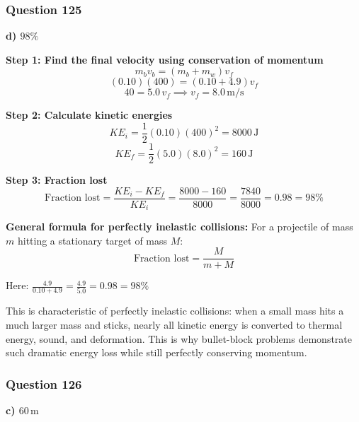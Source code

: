 \documentclass[12pt,letterpaper]{article}
\begin{document}
\subsubsection*{Question 125}

\begin{answerbox}
\textbf{d) $98\%$}
\end{answerbox}

\begin{explanationbox}
\textbf{Step 1: Find the final velocity using conservation of momentum}
\[
m_b v_b = (m_b + m_w)v_f
\]
\[
(0.10)(400) = (0.10 + 4.9)v_f
\]
\[
40 = 5.0\,v_f \implies v_f = 8.0\,\text{m/s}
\]

\textbf{Step 2: Calculate kinetic energies}
\[
KE_i = \frac{1}{2}(0.10)(400)^2 = 8000\,\text{J}
\]
\[
KE_f = \frac{1}{2}(5.0)(8.0)^2 = 160\,\text{J}
\]

\textbf{Step 3: Fraction lost}
\[
\text{Fraction lost} = \frac{KE_i - KE_f}{KE_i} = \frac{8000 - 160}{8000} = \frac{7840}{8000} = 0.98 = 98\%
\]

\textbf{General formula for perfectly inelastic collisions:} For a projectile of mass $m$ hitting
a stationary target of mass $M$:
\[
\text{Fraction lost} = \frac{M}{m + M}
\]

Here: $\frac{4.9}{0.10 + 4.9} = \frac{4.9}{5.0} = 0.98 = 98\%$

This is characteristic of perfectly inelastic collisions: when a small mass hits a much larger mass and sticks, nearly all kinetic energy is converted to thermal energy, sound, and deformation. This is why bullet-block problems demonstrate such dramatic energy loss while still perfectly conserving momentum.
\end{explanationbox}

\subsubsection*{Question 126}

\begin{answerbox}
\textbf{c) $60\,\text{m}$}
\end{answerbox}
\end{document}
